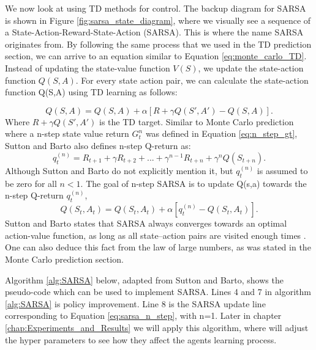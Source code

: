 We now look at using TD methods for control. The backup diagram for SARSA is shown in Figure \ref{fig:sarsa_state_diagram}, where we visually see a sequence of a State-Action-Reward-State-Action (SARSA). This is where the name SARSA originates from. By following the same process that we used in the TD prediction section, we can arrive to an equation similar to Equation \ref{eq:monte_carlo_TD}. Instead of updating the state-value function $V(S)$, we update the state-action function $Q(S,A)$. For every state action pair, we can calculate the state-action function Q(S,A) using TD learning as follows:

\begin{equation}
	Q(S,A) = Q(S,A) + \alpha[R+\gamma Q(S',A') - Q(S,A)].
	\label{eq:sarsa_update}
\end{equation}
Where $R+\gamma Q(S',A')$ is the TD target. Similar to Monte Carlo prediction where a n-step state value return $G^n_t$ was defined in Equation \ref{eq:n_step_gt}, Sutton and Barto also defines n-step Q-return as:
\begin{equation}
	q_{t}^{(n)} = R_{t+1} + \gamma R_{t+2} +...+ \gamma^{n-1}R_{t+n}+\gamma^{n}Q(S_{t+n}).
	\label{eq:q_return}
\end{equation}
Although Sutton and Barto do not explicitly mention it, but $q_{t}^{(n)}$ is assumed to be zero for all $n < 1$.
The goal of n-step SARSA is to update Q(s,a) towards the n-step Q-return $q_t^{(n)}$,
\begin{equation}
	Q(S_t,A_t) = Q(S_t,A_t) + \alpha[q_{t}^{(n)} - Q(S_t,A_t)].
	\label{eq:sarsa_n_step}
\end{equation}
Sutton and Barto states that SARSA always converges towards an optimal action-value function, as long as all state–action
pairs are visited enough times \cite{sutton_barto}. One can also deduce this fact from the law of large numbers, as was stated in the Monte Carlo prediction section.

Algorithm \ref{alg:SARSA} below, adapted from Sutton and Barto, shows the pseudo-code which can be used to implement SARSA. Lines 4 and 7 in algorithm \ref{alg:SARSA} is policy improvement. Line 8 is the SARSA update line corresponding to Equation \ref{eq:sarsa_n_step}, with n=1. Later in chapter \ref{chap:Experiments_and_Results} we will apply this algorithm, where will adjust the hyper parameters to see how they affect the agents learning process.


